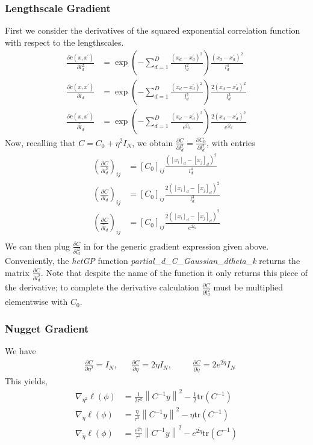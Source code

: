 \documentclass[12pt]{article}
\newcommand*{\norm}[1]{\left\lVert#1\right\rVert}
\begin{document}
\subsubsection{Lengthscale Gradient}
First we consider the derivatives of the squared exponential correlation function with respect to the lengthscales. 
\begin{align*}
\frac{\partial c(x, x^\prime)}{\partial l_d^2} &= \exp\left(-\sum_{d = 1}^{D} \frac{(x_d - x_d^\prime)^2}{l_d^2} \right) \frac{(x_d - x_d^\prime)^2}{l_d^4} \\
\frac{\partial c(x, x^\prime)}{\partial l_d} &= \exp\left(-\sum_{d = 1}^{D} \frac{(x_d - x_d^\prime)^2}{l_d^2} \right) \frac{2(x_d - x_d^\prime)^2}{l_d^3} \\
\frac{\partial c(x, x^\prime)}{\partial \tilde{l}_d} &= \exp\left(-\sum_{d = 1}^{D} \frac{(x_d - x_d^\prime)^2}{e^{2\tilde{l}_d}} \right) \frac{2(x_d - x_d^\prime)^2}{e^{2\tilde{l}_d}}
\end{align*}
Now, recalling that $C = C_0 + \eta^2 I_N$, we obtain $\frac{\partial C}{\partial l_d^2} = \frac{\partial C_0}{\partial l_d^2}$, with entries 
\begin{align*}
\left(\frac{\partial C}{\partial l_d^2} \right)_{ij} &= \left[C_0\right]_{ij} \frac{([x_i]_d - [x_j]_d)^2}{l_d^4} \\
\left(\frac{\partial C}{\partial l_d} \right)_{ij} &= \left[C_0\right]_{ij} \frac{2([x_i]_d - [x_j]_d)^2}{l_d^3} \\
\left(\frac{\partial C}{\partial \tilde{l}_d} \right)_{ij} &= \left[C_0\right]_{ij} \frac{2([x_i]_d - [x_j]_d)^2}{e^{2\tilde{l}_d}} \\
\end{align*}
We can then plug $\frac{\delta C}{\delta l_d^2}$ in for the generic gradient expression given above. Conveniently, the \textit{hetGP} function 
\textit{partial\_d\_C\_Gaussian\_dtheta\_k} returns the matrix $\frac{\partial C}{\partial l_d^2}$. Note that despite the name of the function it only returns 
this piece of the derivative; to complete the derivative calculation $\frac{\partial C}{\partial l_d^2}$ must be multiplied elementwise with $C_0$. 

\subsubsection{Nugget Gradient}
We have 
\begin{align*}
&\frac{\partial C}{\partial \eta^2} = I_N, &&\frac{\partial C}{\partial \eta} = 2\eta I_N, &&&\frac{\partial C}{\partial \tilde{\eta}} = 2e^{2\tilde{\eta}} I_N
\end{align*}
This yields, 
\begin{align*}
\nabla_{\eta^2} \ell(\phi) &= \frac{1}{2\tau^2} \norm{C^{-1}y}^2 - \frac{1}{2} \text{tr}(C^{-1}) \\
\nabla_{\eta} \ell(\phi) &= \frac{\eta}{\tau^2} \norm{C^{-1}y}^2 - \eta \text{tr}(C^{-1}) \\
\nabla_{\tilde{\eta}} \ell(\phi) &= \frac{e^{2\tilde{\eta}}}{\tau^2} \norm{C^{-1}y}^2 - e^{2\tilde{\eta}} \text{tr}(C^{-1})
\end{align*}
\end{document}
